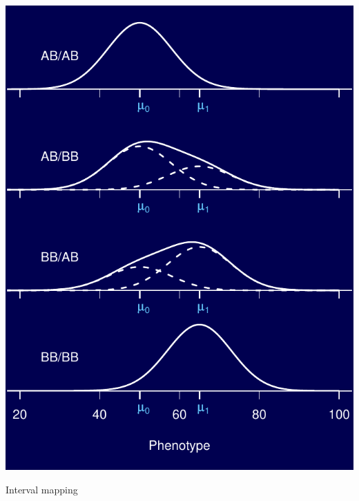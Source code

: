 \documentclass[12pt]{article}
\newcommand{\headsize}{\fontsize{35}{35} \selectfont}
\begin{document}
\begin{minipage}[t]{4.6in}
\vspace*{0mm}

\includegraphics{FigsA/mixtures.pdf}
\end{minipage}




\newpage

\headsize \color{myyellow}
\hfill \begin{minipage}{5.75in}
\centering
Interval mapping
\end{minipage}

\vspace{25mm}
\end{document}
